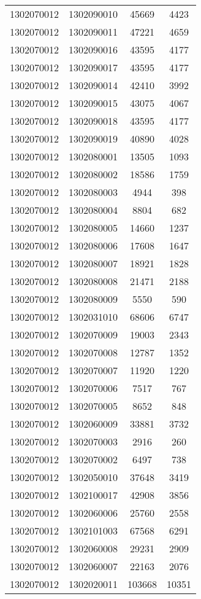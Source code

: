 \begin{longtable}{llcc}
1302070012 & 1302090010 & 45669 & 4423\\
1302070012 & 1302090011 & 47221 & 4659\\
1302070012 & 1302090016 & 43595 & 4177\\
1302070012 & 1302090017 & 43595 & 4177\\
1302070012 & 1302090014 & 42410 & 3992\\
1302070012 & 1302090015 & 43075 & 4067\\
1302070012 & 1302090018 & 43595 & 4177\\
1302070012 & 1302090019 & 40890 & 4028\\
1302070012 & 1302080001 & 13505 & 1093\\
1302070012 & 1302080002 & 18586 & 1759\\
1302070012 & 1302080003 & 4944 & 398\\
1302070012 & 1302080004 & 8804 & 682\\
1302070012 & 1302080005 & 14660 & 1237\\
1302070012 & 1302080006 & 17608 & 1647\\
1302070012 & 1302080007 & 18921 & 1828\\
1302070012 & 1302080008 & 21471 & 2188\\
1302070012 & 1302080009 & 5550 & 590\\
1302070012 & 1302031010 & 68606 & 6747\\
1302070012 & 1302070009 & 19003 & 2343\\
1302070012 & 1302070008 & 12787 & 1352\\
1302070012 & 1302070007 & 11920 & 1220\\
1302070012 & 1302070006 & 7517 & 767\\
1302070012 & 1302070005 & 8652 & 848\\
1302070012 & 1302060009 & 33881 & 3732\\
1302070012 & 1302070003 & 2916 & 260\\
1302070012 & 1302070002 & 6497 & 738\\
1302070012 & 1302050010 & 37648 & 3419\\
1302070012 & 1302100017 & 42908 & 3856\\
1302070012 & 1302060006 & 25760 & 2558\\
1302070012 & 1302101003 & 67568 & 6291\\
1302070012 & 1302060008 & 29231 & 2909\\
1302070012 & 1302060007 & 22163 & 2076\\
1302070012 & 1302020011 & 103668 & 10351\\

\end{longtable}
